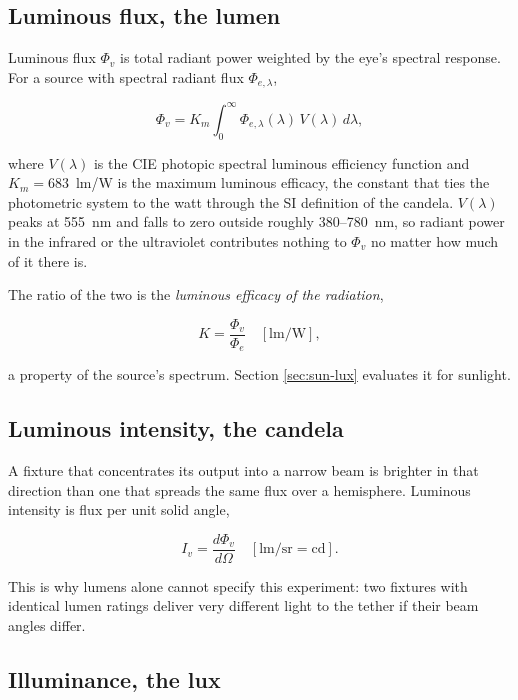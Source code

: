 \subsection{Luminous flux, the lumen}

Luminous flux $\Phi_v$ is total radiant power weighted by the eye's spectral response. For a source with spectral radiant flux $\Phi_{e,\lambda}$,

\begin{equation}
\Phi_v = K_m \int_{0}^{\infty} \Phi_{e,\lambda}(\lambda)\, V(\lambda)\, d\lambda ,
\label{eq:lumen}
\end{equation}

where $V(\lambda)$ is the CIE photopic spectral luminous efficiency function \cite{cie_vlambda} and $K_m = 683$~lm/W is the maximum luminous efficacy, the constant that ties the photometric system to the watt through the SI definition of the candela. $V(\lambda)$ peaks at 555~nm and falls to zero outside roughly 380--780~nm, so radiant power in the infrared or the ultraviolet contributes nothing to $\Phi_v$ no matter how much of it there is.

The ratio of the two is the \emph{luminous efficacy of the radiation},

\begin{equation}
K = \frac{\Phi_v}{\Phi_e} \quad \mathrm{[lm/W]} ,
\label{eq:efficacy}
\end{equation}

a property of the source's spectrum. Section \ref{sec:sun-lux} evaluates it for sunlight.

\subsection{Luminous intensity, the candela}

A fixture that concentrates its output into a narrow beam is brighter in that direction than one that spreads the same flux over a hemisphere. Luminous intensity is flux per unit solid angle,

\begin{equation}
I_v = \frac{d\Phi_v}{d\Omega} \quad \mathrm{[lm/sr = cd]} .
\label{eq:candela}
\end{equation}

This is why lumens alone cannot specify this experiment: two fixtures with identical lumen ratings deliver very different light to the tether if their beam angles differ.

\subsection{Illuminance, the lux}

